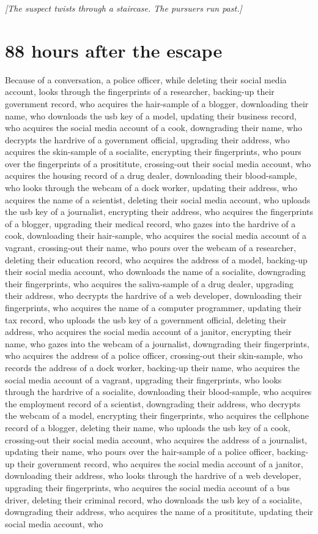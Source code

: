 \documentclass{report}
\begin{document}
\textit{[The suspect twists through a staircase. The pursuers run past.]}


\section*{88 \small{hours after the escape}}

Because of a conversation, a police officer, while deleting their social media account, looks through the fingerprints of a researcher, backing-up their government record, who acquires the hair-sample of a blogger, downloading their name, who downloads the usb key of a model, updating their business record, who acquires the social media account of a cook, downgrading their name, who decrypts the hardrive of a government official, upgrading their address, who acquires the skin-sample of a socialite, encrypting their fingerprints, who pours over the fingerprints of a prosititute, crossing-out their social media account, who acquires the housing record of a drug dealer, downloading their blood-sample, who looks through the webcam of a dock worker, updating their address, who acquires the name of a scientist, deleting their social media account, who uploads the usb key of a journalist, encrypting their address, who acquires the fingerprints of a blogger, upgrading their medical record, who gazes into the hardrive of a cook, downloading their hair-sample, who acquires the social media account of a vagrant, crossing-out their name, who pours over the webcam of a researcher, deleting their education record, who acquires the address of a model, backing-up their social media account, who downloads the name of a socialite, downgrading their fingerprints, who acquires the saliva-sample of a drug dealer, upgrading their address, who decrypts the hardrive of a web developer, downloading their fingerprints, who acquires the name of a computer programmer, updating their tax record, who uploads the usb key of a government official, deleting their address, who acquires the social media account of a janitor, encrypting their name, who gazes into the webcam of a journalist, downgrading their fingerprints, who acquires the address of a police officer, crossing-out their skin-sample, who records the address of a dock worker, backing-up their name, who acquires the social media account of a vagrant, upgrading their fingerprints, who looks through the hardrive of a socialite, downloading their blood-sample, who acquires the employment record of a scientist, downgrading their address, who decrypts the webcam of a model, encrypting their fingerprints, who acquires the cellphone record of a blogger, deleting their name, who uploads the usb key of a cook, crossing-out their social media account, who acquires the address of a journalist, updating their name, who pours over the hair-sample of a police officer, backing-up their government record, who acquires the social media account of a janitor, downloading their address, who looks through the hardrive of a web developer, upgrading their fingerprints, who acquires the social media account of a bus driver, deleting their criminal record, who downloads the usb key of a socialite, downgrading their address, who acquires the name of a prosititute, updating their social media account, who 
\end{document}

